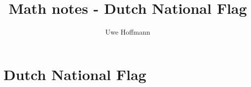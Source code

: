 

\title{Math notes - Dutch National Flag}
\author{Uwe Hoffmann}



\setcounter{chapter}{1}
\chapter*{Dutch National Flag}
